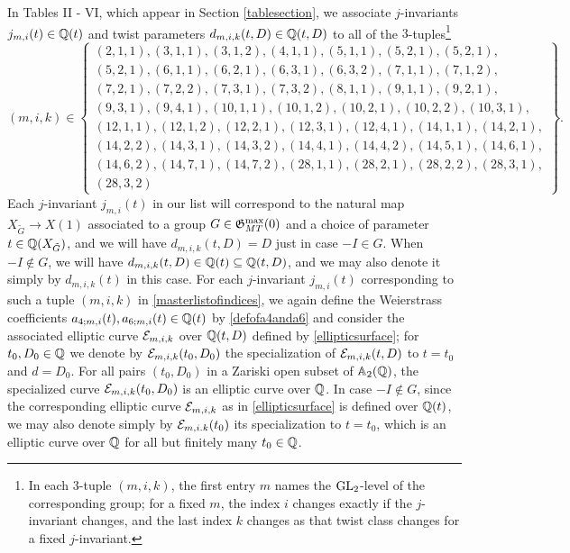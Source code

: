 In Tables II - VI, which appear in Section \ref{tablesection}, we associate $j$-invariants $j_{m,i}(t) \in \mathbb{Q}(t)$ and twist parameters $d_{m,i,k}(t,D) \in \mathbb{Q}(t,D)$ to all of the $3$-tuples\footnote{In each $3$-tuple $(m,i,k)$, the first entry $m$ names the $\operatorname{GL}_2$-level of the corresponding group; for a fixed $m$, the index $i$ changes exactly if the $j$-invariant changes, and the last index $k$ changes as that twist class changes for a fixed $j$-invariant.}
\begin{equation} \label{masterlistofindices}
(m,i,k) \in \left\{ \begin{matrix} 
(2,1,1), (3,1,1), (3,1,2), (4,1,1), (5,1,1), (5,2,1), (5,2,1), \\
(5,2,1), (6,1,1), (6,2,1), (6,3,1), (6,3,2), (7,1,1), (7,1,2), \\
(7,2,1), (7,2,2), (7,3,1), (7,3,2), (8,1,1), (9,1,1), (9,2,1), \\
(9,3,1), (9,4,1), (10,1,1), (10,1,2), (10,2,1), (10,2,2), (10,3,1), \\
(12,1,1), (12,1,2), (12,2,1), (12,3,1), (12,4,1), (14,1,1), (14,2,1), \\
(14,2,2), (14,3,1), (14,3,2), (14,4,1), (14,4,2), (14,5,1), (14,6,1), \\ 
(14,6,2), (14,7,1), (14,7,2), (28,1,1), (28,2,1), (28,2,2), (28,3,1), \\
(28,3,2) \end{matrix} \right\}.
\end{equation}
Each $j$-invariant $j_{m,i}(t)$ in our list will correspond to the natural map $X_{\tilde{G}} \longrightarrow X(1)$ associated to a group $G \in \mathfrak{G}_{MT}^{\max}(0)$ and a choice of parameter $t \in \mathbb{Q}(X_{\tilde{G}})$, and we will have $d_{m,i,k}(t,D) = D$ just in case $-I \in G$.  When  $-I \notin G$, we will have $d_{m,i,k}(t,D) \in \mathbb{Q}(t) \subseteq \mathbb{Q}(t,D)$, and we may also denote it simply by $d_{m,i,k}(t)$ in this case.  For each $j$-invariant $j_{m,i}(t)$ corresponding to such a tuple $(m,i,k)$ in \eqref{masterlistofindices}, we again define the Weierstrass coefficients $a_{4;m,i}(t), a_{6;m,i}(t) \in \mathbb{Q}(t)$ by \eqref{defofa4anda6} and consider the associated elliptic curve $\mathcal{E}_{m,i,k}$ over $\mathbb{Q}(t,D)$ defined by \eqref{ellipticsurface}; for $t_0, D_0 \in \mathbb{Q}$ we denote by $\mathcal{E}_{m,i,k}(t_0,D_0)$ the specialization of $\mathcal{E}_{m,i,k}(t,D)$ to $t = t_0$ and $d = D_0$.  For all pairs $(t_0,D_0)$ in a Zariski open subset of $\mathbb{A}_2(\mathbb{Q})$, the specialized curve $\mathcal{E}_{m,i,k}(t_0,D_0)$ is an elliptic curve over $\mathbb{Q}$.  In case $-I \notin G$, since the corresponding elliptic curve $\mathcal{E}_{m,i,k}$ as in \eqref{ellipticsurface} is defined over $\mathbb{Q}(t)$, we may also denote simply by $\mathcal{E}_{m,i.k}(t_0)$ its specialization to $t = t_0$, which is an elliptic curve over $\mathbb{Q}$ for all but finitely many $t_0 \in \mathbb{Q}$.



